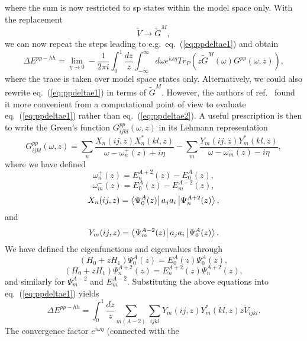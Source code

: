 where the sum is now restricted to sp states within the model space
only. With the replacement
\[
   \tilde{V}\rightarrow \tilde{G}^M,
\]
we can now repeat the steps leading to e.g.\ eq.\ (\ref{eq:ppdeltae1})
and obtain
\begin{equation}
   \Delta E^{pp-hh}=\lim_{\eta \rightarrow 0}
       -\frac{1}{2\pi i}\int_0^1\frac{dz}{z}\int_{-\infty}^{\infty}
       d\omega e^{i\omega\eta}Tr_P\left(
       z\tilde{G}^M(\omega )G^{pp}(\omega ,z)
       \right),
\end{equation}
where the trace is taken over model space states only. Alternatively,
we could also rewrite eq.\ (\ref{eq:ppdeltae1}) in terms of $\tilde{G}^M$.
However,
the authors of ref.\ \cite{shk87} found it more convenient from a
computational point of view to evaluate eq.\ (\ref{eq:ppdeltae1}) rather
than eq.\ (\ref{eq:ppdeltae2}). A useful prescription is then
to write the Green's function $G_{ijkl}^{pp}(\omega ,z)$ in its
Lehmann  representation
\begin{equation}
G_{ijkl}^{pp}(\omega ,z)=\sum_n\frac{X_n(ij,z)X_n^*(kl,z)}
                         {\omega -\omega_n^+(z)+i\eta}
                        -\sum_m\frac{Y_m(ij,z)Y_m^*(kl,z)}
                         {\omega -\omega_m^-(z)-i\eta},
\end{equation}
where we have defined
\begin{equation}
     \omega_n^+(z)=E_n^{A+2}(z)-E_0^A(z),
\end{equation}
\begin{equation}
     \omega_m^-(z)=E_0^A(z)-E_m^{A-2}(z),
\end{equation}
\begin{equation}
     X_n(ij,z)=\left\langle \Psi_0^A(z) \right|a_ja_i\left| \Psi_n^{A+2}(z) \right\rangle,
\end{equation}
and
\begin{equation}
     Y_m(ij,z)=\left\langle \Psi_m^{A-2}(z) \right|a_ja_i\left| \Psi_0^{A}(z) \right\rangle.
\end{equation}
We have defined the eigenfunctions and eigenvalues through
\[
     (H_0+zH_1)\Psi_0^A(z)=E_0^A(z)\Psi_0^A(z),
\]
\[
     (H_0+zH_1)\Psi_n^{A+2}(z)=E_n^{A+2}(z)\Psi_n^{A+2}(z),
\]
and similarly for $\Psi_m^{A-2}$ and $E_m^{A-2}$. Substituting
the above equations into eq.\ (\ref{eq:ppdeltae1}) yields
\begin{equation}
   \Delta E^{pp-hh}=
       \int_0^1\frac{dz}{z}
        \sum_{m(A-2)}\sum_{ijkl}Y_m(ij,z)Y_m^*(kl,z)z\tilde{V}_{ijkl}.
        \label{eq:ppdeltae3}
\end{equation}
The
convergence factor $e^{i\omega\eta}$ (connected with the
